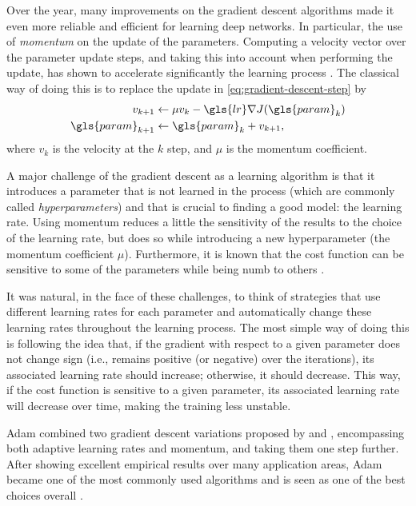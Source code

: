 Over the year, many improvements on the gradient descent algorithms made it even more reliable and efficient for learning deep networks.
In particular, the use of \textit{momentum} on the update of the parameters.
Computing a velocity vector over the parameter update steps, and taking this into account when performing the update, has shown to accelerate significantly the learning process \cite{sutskever_importance_2013}.
The classical way of doing this is to replace the update in \eqref{eq:gradient-descent-step} by
\begin{align*}
    v_{k+1} &\gets \mu v_k - \gls{lr} \nabla J(\gls{param}_k) \\
    \gls{param}_{k+1} &\gets \gls{param}_k + v_{k+1}
,\end{align*}
where $v_k$ is the velocity at the $k$ step, and $\mu$ is the momentum coefficient.

A major challenge of the gradient descent as a learning algorithm is that it introduces a parameter that is not learned in the process (which are commonly called \emph{hyperparameters}) and that is crucial to finding a good model: the learning rate.
Using momentum reduces a little the sensitivity of the results to the choice of the learning rate, but does so while introducing a new hyperparameter (the momentum coefficient $\mu$).
Furthermore, it is known that the cost function can be sensitive to some of the parameters while being numb to others \cite{goodfellow_deep_2016}.

It was natural, in the face of these challenges, to think of strategies that use different learning rates for each parameter and automatically change these learning rates throughout the learning process.
The most simple way of doing this is following the idea that, if the gradient with respect to a given parameter does not change sign (i.e., remains positive (or negative) over the iterations), its associated learning rate should increase; otherwise, it should decrease.
This way, if the cost function is sensitive to a given parameter, its associated learning rate will decrease over time, making the training less unstable.

Adam \cite{kingma_adam_2015} combined two gradient descent variations proposed by \textcite{duchi_adaptive_2011} and \textcite{tieleman_lecture_2012}, encompassing both adaptive learning rates and momentum, and taking them one step further.
After showing excellent empirical results over many application areas, Adam became one of the most commonly used algorithms and is seen as one of the best choices overall \cite{ruder_overview_2017}.

